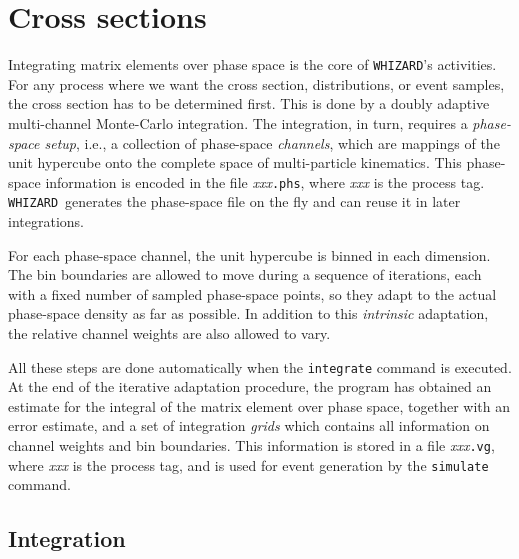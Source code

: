 \documentclass[12pt]{book}
\newcommand{\ttt}[1]{\texttt{#1}}
\newcommand{\whizard}{\ttt{WHIZARD}}
\begin{document}
\section{Cross sections}

Integrating matrix elements over phase space is the core of \whizard's
activities.  For any process where we want the cross section, distributions,
or event samples, the cross section has to be determined first.  This is done
by a doubly adaptive multi-channel Monte-Carlo integration.  The integration,
in turn, requires a \emph{phase-space setup}, i.e., a collection of
phase-space \emph{channels}, which are mappings of the unit hypercube onto the
complete space of multi-particle kinematics.  This phase-space information is
encoded in the file \emph{xxx}\ttt{.phs}, where \emph{xxx} is the process tag.
\whizard\ generates the phase-space file on the fly and can reuse it in later
integrations.

For each phase-space channel, the unit hypercube is binned in each dimension.
The bin boundaries are allowed to move during a sequence of iterations, each
with a fixed number of sampled phase-space points, so they adapt to the actual
phase-space density as far as possible.  In addition to this \emph{intrinsic}
adaptation, the relative channel weights are also allowed to vary.

All these steps are done automatically when the \ttt{integrate} command is
executed.  At the end of the iterative adaptation procedure, the program has
obtained an estimate for the integral of the matrix element over phase space,
together with an error estimate, and a set of integration \emph{grids} which
contains all information on channel weights and bin boundaries.  This
information is stored in a file \emph{xxx}\ttt{.vg}, where \emph{xxx} is the
process tag, and is used for event generation by the \ttt{simulate}
command.


\subsection{Integration}
\label{sec:integrate}
\end{document}
